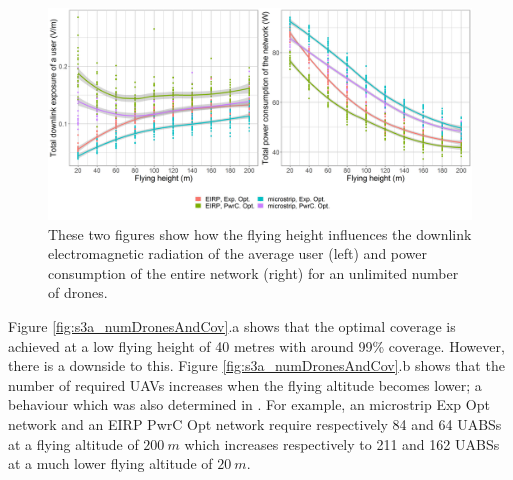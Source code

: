 \begin{figure}[h!]
  \includegraphics[width=\textwidth]{../results/s3/fhvsdlAndPc.png}
  \caption{
    These two figures show how the flying height influences the downlink electromagnetic radiation of the average user (left) and 
  power consumption of the entire network (right) for an unlimited number of drones.
  }
     \label{fig:s3a_dlAndPc}
\end{figure}
Figure \ref{fig:s3a_numDronesAndCov}.a shows that the optimal coverage is achieved at a low flying height of 
40 metres with around 99\% coverage. 
However, there is a downside to this. 
Figure \ref{fig:s3a_numDronesAndCov}.b 
 shows that the number of required \gls{UAV}s increases when the flying altitude becomes lower;
a behaviour which was also determined in \cite{J2}.
For example, an microstrip \gls{Exp Opt} network and an \gls{EIRP} \gls{PwrC Opt} network require respectively 84 and 64
\gls{UABS}s at a flying altitude of $200\ m$ which increases respectively to 211 and 162 \gls{UABS}s at a much lower flying altitude of $20\ m$.

